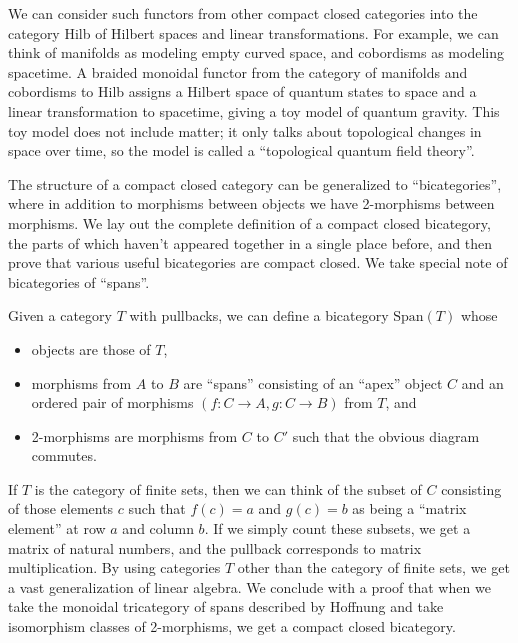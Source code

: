 \documentclass[12pt,twoside,openright]{report}
\newcommand{\Span}{\mbox{Span}}
\begin{document}
We can consider such functors from other compact closed categories into the category Hilb of Hilbert spaces and linear transformations.  For example, we can think of manifolds as modeling empty curved space, and cobordisms as modeling spacetime.  A braided monoidal functor from the category of manifolds and cobordisms to Hilb assigns a Hilbert space of quantum states to space and a linear transformation to spacetime, giving a toy model of quantum gravity.  This toy model does not include matter; it only talks about topological changes in space over time, so the model is called a ``topological quantum field theory''.

The structure of a compact closed category can be generalized to ``bicategories'', where in addition to morphisms between objects we have 2-morphisms between morphisms.  We lay out the complete definition of a compact closed bicategory, the parts of which haven't appeared together in a single place before, and then prove that various useful bicategories are compact closed.  We take special note of bicategories of ``spans''.

Given a category $T$ with pullbacks, we can define a bicategory $\Span(T)$ whose
\begin{itemize}
  \item objects are those of $T$,
  \item morphisms from $A$ to $B$ are ``spans'' consisting of an ``apex'' object $C$ and an ordered pair of morphisms $(f:C\to A, g:C \to B)$ from $T$, and
  \item 2-morphisms are morphisms from $C$ to $C'$ such that the obvious diagram commutes.
\end{itemize}
If $T$ is the category of finite sets, then we can think of the subset of $C$ consisting of those elements $c$ such that $f(c) = a$ and $g(c) = b$ as being a ``matrix element'' at row $a$ and column $b$.  If we simply count these subsets, we get a matrix of natural numbers, and the pullback corresponds to matrix multiplication.  By using categories $T$ other than the category of finite sets, we get a vast generalization of linear algebra.  We conclude with a proof that when we take the monoidal tricategory of spans described by Hoffnung \cite{Hoffnung} and take isomorphism classes of 2-morphisms, we get a compact closed bicategory.
\end{document}
